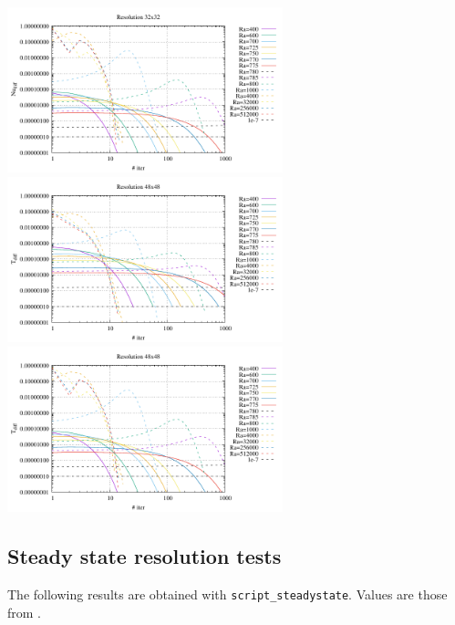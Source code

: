\begin{center}
\includegraphics[width=8cm]{python_codes/md/results_new/conv_32x32_Nu.pdf}\\
\includegraphics[width=8cm]{python_codes/md/results_new/conv_48x48_T.pdf}
\includegraphics[width=8cm]{python_codes/md/results_new/conv_48x48_Nu.pdf}
{\captionfont } 
\end{center}

\newpage
\subsection*{Steady state resolution tests}

The following results are obtained with {\tt script\_steadystate}.
Values are those from \textcite{blbc89}.

